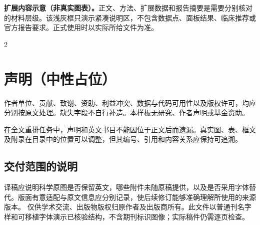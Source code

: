 \documentclass[UTF8,fontset=none,scheme=plain]{ctexart}
\renewcommand{\normalsize}{\fontsize{9.05bp}{12.1bp}\selectfont}
\newenvironment{NGColumns}{\begin{multicols}{2}\normalsize}{\end{multicols}}
\begin{document}
\vspace{9bp}\noindent\colorbox{NGLight}{\begin{minipage}{\dimexpr\linewidth-2\fboxsep\relax}\sffamily\fontsize{7.6bp}{9.2bp}\selectfont
\textbf{扩展内容示意（非真实图表）。}正文、方法、扩展数据和报告摘要是需要分别核对的材料层级。该浅灰框只演示紧凑说明区，不包含数据点、面板结果、临床推荐或官方报告要求。正式使用时以实际所给文件为准。
\end{minipage}}\par\vspace{6bp}
\begin{NGColumns}
\section*{声明（中性占位）}
作者单位、贡献、致谢、资助、利益冲突、数据与代码可用性以及版权许可，均应分别按原文处理。缺失字段不自行补造。本样板无研究、作者声明或基金资助。
\par 在全文重排任务中，声明和英文书目不能因位于正文后而遗漏。真实图、表、框文及附录在目录中的位置可以调整，但其编号、引用和内容关系应保持可追溯。\par
\subsection*{交付范围的说明}
译稿应说明科学原图是否保留英文，哪些附件未随原稿提供，以及是否采用字体替代。版面有意适配与原文信息应分别记录，使后续修订能够准确理解所使用的来源版本。
\SampleBibliography
\SampleSourceInfo
仅供学术交流、出版物版权归原作者及出版商所有。此文件以普通刊名字样和可移植字体演示已核验结构，不含期刊标识图像；实际稿件仍需逐页检查。
\end{NGColumns}
\end{document}
